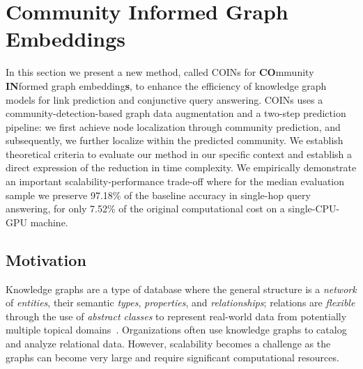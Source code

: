 \section{Community Informed Graph Embeddings}
\label{sec: coins}


In this section we present a new method, called COINs for \textbf{CO}mmunity \textbf{IN}formed graph embedding\textbf{s}, to enhance the efficiency of knowledge graph models for link prediction and conjunctive query answering. COINs uses a community-detection-based graph data augmentation and a two-step prediction pipeline: we first achieve node localization through community prediction, and subsequently, we further localize within the predicted community. We establish theoretical criteria to evaluate our method in our specific context and establish a direct expression of the reduction in time complexity. We empirically demonstrate an important scalability-performance trade-off where for the median evaluation sample we preserve 97.18\% of the baseline accuracy in single-hop query answering, for only 7.52\% of the original computational cost on a single-CPU-GPU machine.

\subsection{Motivation}
Knowledge graphs are a type of database where the general structure is a \emph{network} of \emph{entities}, their semantic \emph{types}, \emph{properties}, and \emph{relationships}; relations are \emph{flexible} through the use of \emph{abstract classes} to represent real-world data from potentially multiple topical domains~\cite{ehrlinger_towards_2016,hogan_knowledge_2020}. Organizations often use knowledge graphs to catalog and analyze relational data. However, scalability becomes a challenge as the graphs can become very large and require significant computational resources. %


